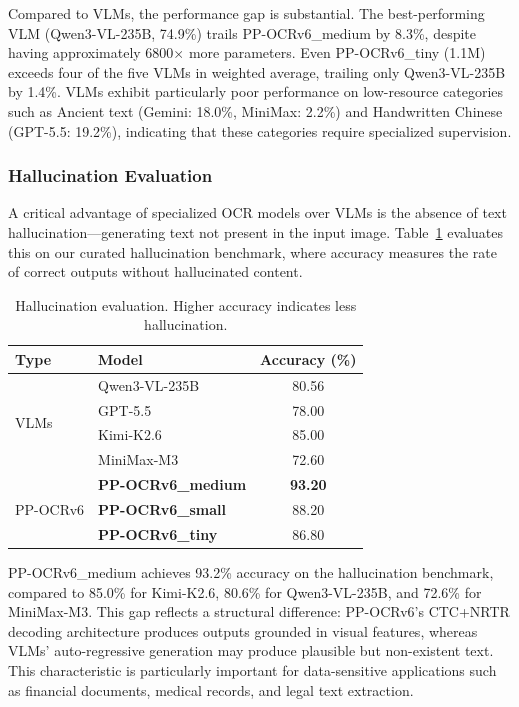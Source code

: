 \documentclass[11pt, a4paper,logo,  copyright, nonumbering]{paddleocr}
\begin{document}
Compared to VLMs, the performance gap is substantial. The best-performing VLM (Qwen3-VL-235B, 74.9\%) trails PP-OCRv6\_medium by 8.3\%, despite having approximately 6800$\times$ more parameters. Even PP-OCRv6\_tiny (1.1M) exceeds four of the five VLMs in weighted average, trailing only Qwen3-VL-235B by 1.4\%. VLMs exhibit particularly poor performance on low-resource categories such as Ancient text (Gemini: 18.0\%, MiniMax: 2.2\%) and Handwritten Chinese (GPT-5.5: 19.2\%), indicating that these categories require specialized supervision.


\subsubsection{Hallucination Evaluation}

A critical advantage of specialized OCR models over VLMs is the absence of text hallucination---generating text not present in the input image. Table~\ref{tab:hallucination} evaluates this on our curated hallucination benchmark, where accuracy measures the rate of correct outputs without hallucinated content.

\begin{table}[!htbp]
\centering
\small
\begin{tabular}{llc}
\toprule
\textbf{Type} & \textbf{Model} & \textbf{Accuracy (\%)} \\
\midrule
\multirow{4}{*}{VLMs} & Qwen3-VL-235B & 80.56 \\
 & GPT-5.5 & 78.00 \\
 & Kimi-K2.6 & 85.00 \\
 & MiniMax-M3 & 72.60 \\
\midrule
\multirow{3}{*}{PP-OCRv6} & \textbf{PP-OCRv6\_medium} & \textbf{93.20} \\
 & \textbf{PP-OCRv6\_small} & 88.20 \\
 & \textbf{PP-OCRv6\_tiny} & 86.80 \\
\bottomrule
\end{tabular}
\caption{Hallucination evaluation. Higher accuracy indicates less hallucination.}
\label{tab:hallucination}
\end{table}

PP-OCRv6\_medium achieves 93.2\% accuracy on the hallucination benchmark, compared to 85.0\% for Kimi-K2.6, 80.6\% for Qwen3-VL-235B, and 72.6\% for MiniMax-M3. This gap reflects a structural difference: PP-OCRv6's CTC+NRTR decoding architecture produces outputs grounded in visual features, whereas VLMs' auto-regressive generation may produce plausible but non-existent text. This characteristic is particularly important for data-sensitive applications such as financial documents, medical records, and legal text extraction.
\end{document}
